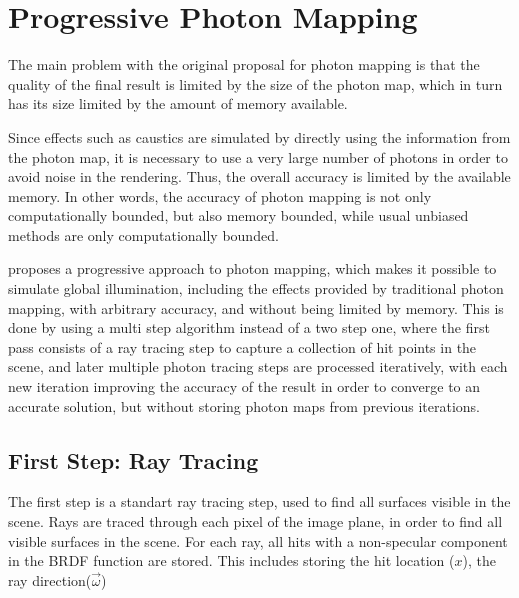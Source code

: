 \documentclass[main.tex]{subfiles}
\begin{document}
\section{Progressive Photon Mapping} \label{section:ppm}

The main problem with the original proposal for photon mapping is that the quality of the final result is limited by the size of the photon map, which in turn has its size limited by the amount of memory available.

Since effects such as caustics are simulated by directly using the information from the photon map, it is necessary to use a very large number of photons in order to avoid noise in the rendering. Thus, the overall accuracy is limited by the available memory. In other words, the accuracy of photon mapping is not only computationally bounded, but also memory bounded, while usual unbiased methods are only computationally bounded.

\cite{hachisuka2008progressive} proposes a progressive approach to photon mapping, which makes it possible to simulate global illumination, including the effects provided by traditional photon mapping, with arbitrary accuracy, and without being limited by memory. This is done by using a multi step algorithm instead of a two step one, where the first pass consists of a ray tracing step to capture a collection of hit points in the scene, and later multiple photon tracing steps are processed iteratively, with each new iteration improving the accuracy of the result in order to converge to an accurate solution, but without storing photon maps from previous iterations.


\subsection{First Step: Ray Tracing}

The first step is a standart ray tracing step, used to find all surfaces visible in the scene. Rays are traced through each pixel of the image plane, in order to find all visible surfaces in the scene. For each ray, all hits with a non-specular component in the \acs{BRDF} function are stored. This includes storing the hit location ($x$), the ray direction($\vec{\omega}$)

\end{document}

